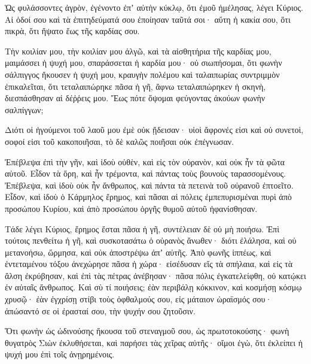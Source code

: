 {Ὡς φυλάσσοντες ἀγρὸν, ἐγένοντο ἐπʼ αὐτὴν κύκλῳ, ὅτι ἐμοῦ ἠμέλησας, λέγει Κύριος.
Αἱ ὁδοί σου καὶ τὰ ἐπιτηδεύματά σου ἐποίησαν ταῦτά σοι· αὕτη ἡ κακία σου, ὅτι πικρὰ, ὅτι ἥψατο ἕως τῆς καρδίας σου.
\par }{\PP {}Τὴν κοιλίαν μου, τὴν κοιλίαν μου ἀλγῶ, καὶ τὰ αἰσθητήρια τῆς καρδίας μου, μαιμάσσει ἡ ψυχή μου, σπαράσσεται ἡ καρδία μου· οὐ σιωπήσομαι, ὅτι φωνὴν σάλπιγγος ἤκουσεν ἡ ψυχή μου, κραυγὴν πολέμου
καὶ ταλαιπωρίας συντριμμὸν ἐπικαλεῖται, ὅτι τεταλαιπώρηκε πᾶσα ἡ γῆ, ἄφνω τεταλαιπώρηκεν ἡ σκηνὴ, διεσπάσθησαν αἱ δέῤῥεις μου.
Ἕως πότε ὄψομαι φεύγοντας ἀκούων φωνὴν σαλπίγγων;
\par }{\PP {}Διότι οἱ ἡγούμενοι τοῦ λαοῦ μου ἐμὲ οὐκ ᾔδεισαν· υἱοὶ ἄφρονές εἰσι καὶ οὐ συνετοὶ, σοφοί εἰσι τοῦ κακοποιῆσαι, τὸ δὲ καλῶς ποιῆσαι οὐκ ἐπέγνωσαν.
\par }{\PP {}Ἐπέβλεψα ἐπὶ τὴν γῆν, καὶ ἰδοὺ οὐθὲν, καὶ εἰς τὸν οὐρανὸν, καὶ οὐκ ἦν τὰ φῶτα αὐτοῦ.
Εἶδον τὰ ὄρη, καὶ ἦν τρέμοντα, καὶ πάντας τοὺς βουνοὺς ταρασσομένους.
Ἐπέβλεψα, καὶ ἰδοὺ οὐκ ἦν ἄνθρωπος, καὶ πάντα τὰ πετεινὰ τοῦ οὐρανοῦ ἐπτοεῖτο.
Εἶδον, καὶ ἰδοὺ ὁ Κάρμηλος ἔρημος, καὶ πᾶσαι αἱ πόλεις ἐμπεπυρισμέναι πυρὶ ἀπὸ προσώπου Κυρίου, καὶ ἀπὸ προσώπου ὀργῆς θυμοῦ αὐτοῦ ἠφανίσθησαν.
\par }{\PP {}Τάδε λέγει Κύριος, ἔρημος ἔσται πᾶσα ἡ γῆ, συντέλειαν δὲ οὐ μὴ ποιήσω.
Ἐπὶ τούτοις πενθείτω ἡ γῆ, καὶ συσκοτασάτω ὁ οὐρανὸς ἄνωθεν· διότι ἐλάλησα, καὶ οὐ μετανοήσω, ὥρμησα, καὶ οὐκ ἀποστρέψω ἀπʼ αὐτῆς.
Ἀπὸ φωνῆς ἱππέως, καὶ ἐντεταμένου τόξου ἀνεχώρησε πᾶσα ἡ χώρα· εἰσέδυσαν εἴς τὰ σπήλαια, καὶ εἰς τὰ ἄλση ἐκρύβησαν, καὶ ἐπὶ τὰς πέτρας ἀνέβησαν· πᾶσα πόλις ἐγκατελείφθη, οὐ κατῴκει ἐν αὐταῖς ἄνθρωπος.
Καὶ σὺ τί ποιήσεις; ἐὰν περιβάλῃ κόκκινον, καὶ κοσμήσῃ κόσμῳ χρυσῷ· ἐὰν ἐγχρίσῃ στίβι τοὺς ὀφθαλμούς σου, εἰς μάταιον ὡραϊσμός σου· ἀπώσαντό σε οἱ ἐρασταί σου, τὴν ψυχήν σου ζητοῦσιν.
\par }{\PP {}Ὅτι φωνὴν ὡς ὠδινούσης ἤκουσα τοῦ στεναγμοῦ σου, ὡς πρωτοτοκούσης· φωνὴ θυγατρὸς Σιὼν ἐκλυθήσεται, καὶ παρήσει τὰς χεῖρας αὐτῆς· οἴμοι ἐγὼ, ὅτι ἐκλείπει ἡ ψυχή μου ἐπὶ τοῖς ἀνῃρημένοις.

}
